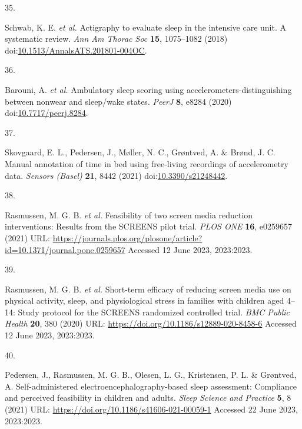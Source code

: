 \documentclass[
  9pt,
]{article}
\newlength{\cslhangindent}
\newlength{\csllabelwidth}
\newlength{\cslentryspacingunit} %
\newenvironment{CSLReferences}[2] %
 {%
  \setlength{\parindent}{0pt}
  \ifodd #1
  \let\oldpar\par
  \def\par{\hangindent=\cslhangindent\oldpar}
  \fi
  \setlength{\parskip}{#2\cslentryspacingunit}
 }%
 {}
\newcommand{\CSLLeftMargin}[1]{\parbox[t]{\csllabelwidth}{#1}}
\newcommand{\CSLRightInline}[1]{\parbox[t]{\linewidth - \csllabelwidth}{#1}\break}
\begin{document}
\begin{CSLReferences}{0}{0}
\leavevmode{}%
\CSLLeftMargin{35. }%
\CSLRightInline{Schwab, K. E. \emph{et al.} Actigraphy to evaluate sleep
in the intensive care unit. A systematic review. \emph{Ann Am Thorac
Soc} \textbf{15}, 1075--1082 (2018)
doi:\href{https://doi.org/10.1513/AnnalsATS.201801-004OC}{10.1513/AnnalsATS.201801-004OC}.}

\leavevmode{}%
\CSLLeftMargin{36. }%
\CSLRightInline{Barouni, A. \emph{et al.} Ambulatory sleep scoring using
accelerometers-distinguishing between nonwear and sleep/wake states.
\emph{{PeerJ}} \textbf{8}, e8284 (2020)
doi:\href{https://doi.org/10.7717/peerj.8284}{10.7717/peerj.8284}.}

\leavevmode{}%
\CSLLeftMargin{37. }%
\CSLRightInline{Skovgaard, E. L., Pedersen, J., Møller, N. C., Grøntved,
A. \& Brønd, J. C. Manual annotation of time in bed using free-living
recordings of accelerometry data. \emph{Sensors (Basel)} \textbf{21},
8442 (2021)
doi:\href{https://doi.org/10.3390/s21248442}{10.3390/s21248442}.}

\leavevmode{}%
\CSLLeftMargin{38. }%
\CSLRightInline{Rasmussen, M. G. B. \emph{et al.} Feasibility of two
screen media reduction interventions: Results from the {SCREENS} pilot
trial. \emph{{PLOS} {ONE}} \textbf{16}, e0259657 (2021) URL:
\url{https://journals.plos.org/plosone/article?id=10.1371/journal.pone.0259657}
Accessed 12 June 2023, 2023:2023.}

\leavevmode{}%
\CSLLeftMargin{39. }%
\CSLRightInline{Rasmussen, M. G. B. \emph{et al.} Short-term efficacy of
reducing screen media use on physical activity, sleep, and physiological
stress in families with children aged 4--14: Study protocol for the
{SCREENS} randomized controlled trial. \emph{{BMC} Public Health}
\textbf{20}, 380 (2020) URL:
\url{https://doi.org/10.1186/s12889-020-8458-6} Accessed 12 June 2023,
2023:2023.}

\leavevmode{}%
\CSLLeftMargin{40. }%
\CSLRightInline{Pedersen, J., Rasmussen, M. G. B., Olesen, L. G.,
Kristensen, P. L. \& Grøntved, A. Self-administered
electroencephalography-based sleep assessment: Compliance and perceived
feasibility in children and adults. \emph{Sleep Science and Practice}
\textbf{5}, 8 (2021) URL:
\url{https://doi.org/10.1186/s41606-021-00059-1} Accessed 22 June 2023,
2023:2023.}


\end{CSLReferences}
\end{document}
